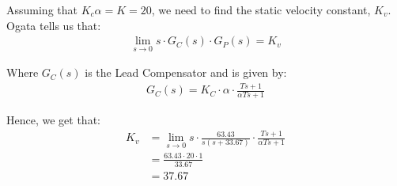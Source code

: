 \documentclass{article}
\begin{document}
Assuming that $K_c\alpha = K = 20$, we need to find the static velocity constant, $K_v$. Ogata tells us that:
\begin{align*}
	\lim_{s \rightarrow 0} s \cdot G_C(s) \cdot G_P(s) = K_v
\end{align*}

Where $G_C(s)$ is the Lead Compensator and is given by:
\begin{align*}
	G_C(s) = K_C \cdot \alpha \cdot \frac{Ts + 1}{\alpha Ts + 1}
\end{align*}

Hence, we get that:
\begin{align*}
	K_v &= \lim_{s \rightarrow 0} s \cdot \frac{63.43}{s(s + 33.67)} \cdot \frac{Ts+1}{\alpha Ts + 1}\\
		&= \frac{63.43 \cdot 20 \cdot 1}{33.67}\\
		&= 37.67
\end{align*}
\end{document}

